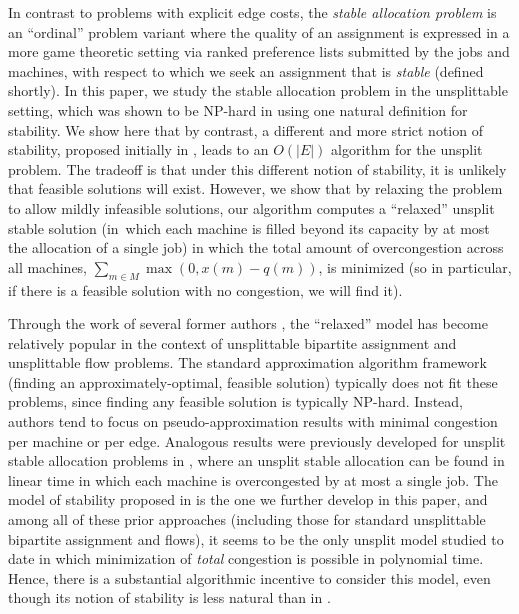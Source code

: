 \documentclass{llncs}
\begin{document}
In contrast to problems with explicit edge costs, the \emph{stable
  allocation problem} is an ``ordinal'' problem variant where the
quality of an assignment is expressed in a more game theoretic setting
via ranked preference lists submitted by the jobs and machines, with
respect to which we seek an assignment that is \emph{stable} (defined
shortly).  In this paper, we study the stable allocation problem in
the unsplittable setting, which was shown to be NP-hard in
\cite{DBLP:journals/jco/McDermidM10} using one natural definition for
stability.  We show here that by contrast, a different and more strict
notion of stability, proposed initially in \cite{dean_unsplit}, leads
to an $O(|E|)$ algorithm for the unsplit problem.  The tradeoff is
that under this different notion of stability, it is unlikely that
feasible solutions will exist.  However, we show that by relaxing the
problem to allow mildly infeasible solutions, our algorithm 
computes a ``relaxed'' unsplit stable solution (in~which each machine
is filled beyond its capacity by at most the allocation of a single
job) in which the total amount of overcongestion across all machines,
$\sum_{m \in M} { \max\left(0, x(m)-q(m)\right)}$, is minimized (so
in particular, if there is a feasible solution with no congestion, we
will find it).

Through the work of several former authors
\cite{DinitzGG99,Skutella00,ShmoysT93}, the ``relaxed'' model has
become relatively popular in the context of unsplittable bipartite
assignment and unsplittable flow problems.  The standard approximation
algorithm framework (finding an approximately-optimal, feasible
solution) typically does not fit these problems, since finding any
feasible solution is typically NP-hard.  Instead, authors tend to
focus on pseudo-approximation results with minimal congestion per
machine or per edge.  Analogous results were previously developed for
unsplit stable allocation problems in \cite{dean_unsplit}, where an
unsplit stable allocation can be found in linear time in which each
machine is overcongested by at most a single job.  The model of
stability proposed in \cite{dean_unsplit} is the one we further
develop in this paper, and among all of these prior approaches
(including those for standard unsplittable bipartite assignment and
flows), it seems to be the only unsplit model studied to date in which
minimization of {\em total} congestion is possible in polynomial time.
Hence, there is a substantial algorithmic incentive to consider this
model, even though its notion of stability is less natural than in
\cite{DBLP:journals/jco/McDermidM10}.
\end{document}
